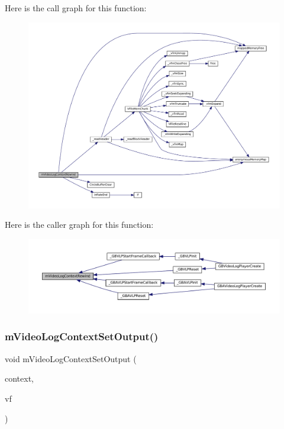 Here is the call graph for this function\+:
\nopagebreak
\begin{figure}[H]
\begin{center}
\leavevmode
\includegraphics[width=350pt]{video-logger_8c_aea08663b76690e7220b3f8377f971785_cgraph}
\end{center}
\end{figure}
Here is the caller graph for this function\+:
\nopagebreak
\begin{figure}[H]
\begin{center}
\leavevmode
\includegraphics[width=350pt]{video-logger_8c_aea08663b76690e7220b3f8377f971785_icgraph}
\end{center}
\end{figure}
\mbox{\label{video-logger_8c_a89d33ff62ba22b7fcd0fe5e895b4c95e}} 
\subsubsection{\texorpdfstring{m\+Video\+Log\+Context\+Set\+Output()}{mVideoLogContextSetOutput()}}
{\footnotesize\ttfamily void m\+Video\+Log\+Context\+Set\+Output (\begin{DoxyParamCaption}\item[{struct m\+Video\+Log\+Context $\ast$}]{context,  }\item[{struct V\+File $\ast$}]{vf }\end{DoxyParamCaption})}

